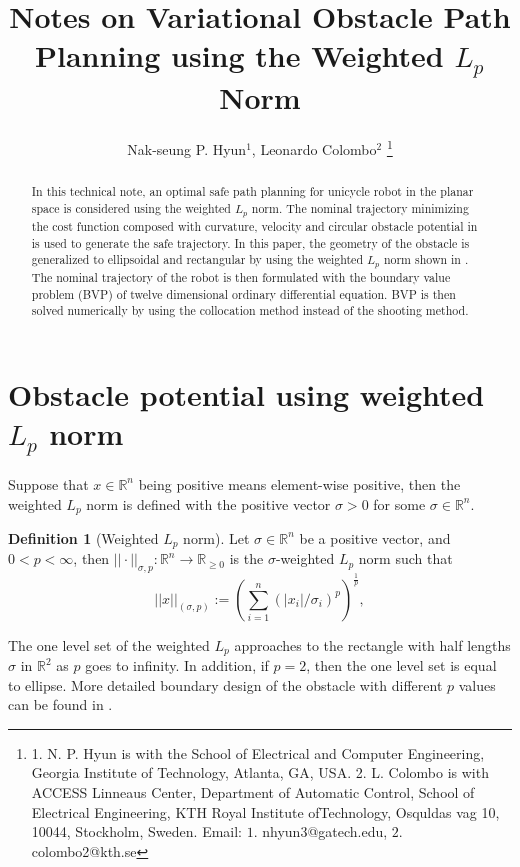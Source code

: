 \documentclass[letterpaper, 11 pt, onecolumn]{ieeeconf}  %
\title{\LARGE \bf
Notes on Variational Obstacle Path Planning using the Weighted $L_p$ Norm
}
\author{Nak-seung P. Hyun$^{1}$, Leonardo Colombo$^{2}$ %
\thanks{1. N. P. Hyun is with the School of Electrical and Computer Engineering,
Georgia Institute of Technology, Atlanta, GA, USA. 2. L. Colombo is with ACCESS Linneaus Center, Department of Automatic
Control, School of Electrical Engineering, KTH Royal Institute
ofTechnology, Osquldas vag 10, 10044, Stockholm, Sweden.
Email: $1.$ nhyun3@gatech.edu, $2.$ colombo2@kth.se}%
}
\theoremstyle{definition}
\newtheorem{definition}{Definition}
\newcommand{\halfL}{\sigma}
\begin{document}
\maketitle
\thispagestyle{empty}
\pagestyle{empty}


\begin{abstract}
In this technical note, an optimal safe path planning for unicycle robot in the planar space is considered using the weighted $L_p$ norm. The nominal trajectory minimizing the cost function composed with curvature, velocity and circular obstacle potential in \cite{Colombo2017cdc} is used to generate the safe trajectory. In this paper, the geometry of the obstacle is generalized to ellipsoidal and rectangular by using the weighted $L_p$ norm shown in \cite{Hyun2017Lp}. The nominal trajectory of the robot is then formulated with the boundary value problem (BVP) of twelve dimensional ordinary differential equation. BVP is then solved numerically by using the collocation method instead of the shooting method. 
\end{abstract}

\section{Obstacle potential using weighted $L_p$ norm}

Suppose that $x\in\mathbb{R}^n$ being positive means element-wise positive, then the weighted $L_p$ norm is defined with the positive vector $\halfL>0$ for some $\halfL\in\mathbb{R}^n$. 
\begin{definition}[Weighted $L_p$ norm]
\label{def:weighted_Lp}
Let $\halfL \in \mathbb{R}^n$ be a positive vector, and $0 < p < \infty$, 
then $||\cdot||_{\halfL, p}:\mathbb{R}^n\to\mathbb{R}_{\geq 0}$ is the
$\halfL$-weighted $L_p$ norm such that
\begin{equation*}
  ||x||_{(\halfL,p)} := \left(\sum_{i=1}^n 
         ({|x_i|}/{\halfL_i})^p\right)^{\frac{1}{p}},
\end{equation*} 
\end{definition}
The one level set of the weighted $L_p$ approaches to the rectangle with half lengths $\halfL$ in $\mathbb{R}^2$ as $p$ goes to infinity. In addition, if $p=2$, then the one level set is equal to ellipse. More detailed boundary design of the obstacle with different $p$ values can be found in \cite{Hyun2017Lp}. 
\end{document}
